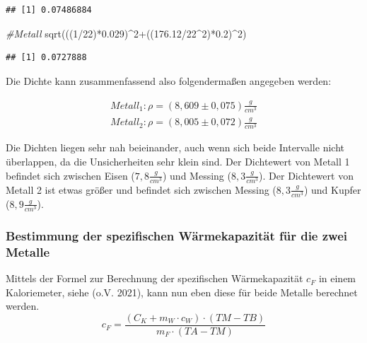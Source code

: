 \documentclass[
  9pt,
]{article}
\newenvironment{Shaded}{\begin{snugshade}}{\end{snugshade}}
\newcommand{\CommentTok}[1]{\textcolor[rgb]{0.56,0.35,0.01}{\textit{#1}}}
\newcommand{\DecValTok}[1]{\textcolor[rgb]{0.00,0.00,0.81}{#1}}
\newcommand{\FloatTok}[1]{\textcolor[rgb]{0.00,0.00,0.81}{#1}}
\newcommand{\FunctionTok}[1]{\textcolor[rgb]{0.00,0.00,0.00}{#1}}
\newcommand{\NormalTok}[1]{#1}
\newcommand{\SpecialCharTok}[1]{\textcolor[rgb]{0.00,0.00,0.00}{#1}}
\begin{document}
\begin{verbatim}
## [1] 0.07486884
\end{verbatim}

\begin{Shaded}
\begin{Highlighting}[]
\CommentTok{\#Metall }
\FunctionTok{sqrt}\NormalTok{(((}\DecValTok{1}\SpecialCharTok{/}\DecValTok{22}\NormalTok{)}\SpecialCharTok{*}\FloatTok{0.029}\NormalTok{)}\SpecialCharTok{\^{}}\DecValTok{2}\SpecialCharTok{+}\NormalTok{((}\FloatTok{176.12}\SpecialCharTok{/}\DecValTok{22}\SpecialCharTok{\^{}}\DecValTok{2}\NormalTok{)}\SpecialCharTok{*}\FloatTok{0.2}\NormalTok{)}\SpecialCharTok{\^{}}\DecValTok{2}\NormalTok{)}
\end{Highlighting}
\end{Shaded}

\begin{verbatim}
## [1] 0.0727888
\end{verbatim}

Die Dichte kann zusammenfassend also folgendermaßen angegeben werden:

\begin{equation*}
\begin{split}
Metall_1: \rho = (8,609 \pm 0,075) \frac{g}{cm^3}\\
Metall_2: \rho = (8, 005\pm 0,072) \frac{g}{cm^3}
\end{split}
\end{equation*}

Die Dichten liegen sehr nah beieinander, auch wenn sich beide Intervalle
nicht überlappen, da die Unsicherheiten sehr klein sind. Der Dichtewert
von Metall 1 befindet sich zwischen Eisen (\(7,8 \frac{g}{cm^3}\)) und
Messing (\(8,3 \frac{g}{cm^3}\)). Der Dichtewert von Metall 2 ist etwas
größer und befindet sich zwischen Messing (\(8,3 \frac{g}{cm^3}\)) und
Kupfer (\(8,9 \frac{g}{cm^3}\)).

\hypertarget{bestimmung-der-spezifischen-wuxe4rmekapazituxe4t-fuxfcr-die-zwei-metalle}{%
\subsubsection{Bestimmung der spezifischen Wärmekapazität für die zwei
Metalle}\label{bestimmung-der-spezifischen-wuxe4rmekapazituxe4t-fuxfcr-die-zwei-metalle}}

Mittels der Formel zur Berechnung der spezifischen Wärmekapazität
\(c_F\) in einem Kaloriemeter, siehe (o.V. 2021), kann nun eben diese
für beide Metalle berechnet werden.
\begin{equation}\label{Kaloriemeter:c_F}
c_F = \frac{(C_K + m_W\cdot c_W)\cdot (TM-TB)}{m_F\cdot (TA-TM)}
\end{equation}
\end{document}

